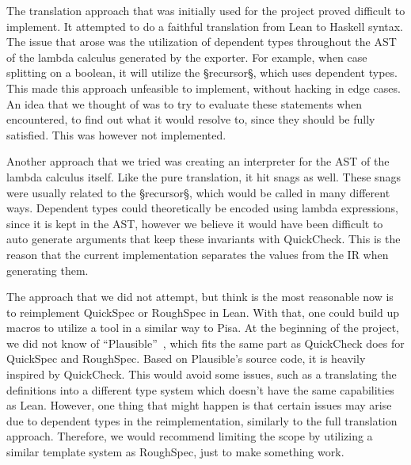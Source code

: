 The translation approach that was initially used for the project proved difficult to implement.
It attempted to do a faithful translation from Lean to Haskell syntax.
The issue that arose was the utilization of dependent types throughout the AST of the lambda calculus generated by the exporter.
For example, when case splitting on a boolean, it will utilize the §recursor§, which uses dependent types.
This made this approach unfeasible to implement, without hacking in edge cases.
An idea that we thought of was to try to evaluate these statements when encountered, to find out what it would resolve to, since they should be fully satisfied.
This was however not implemented.

Another approach that we tried was creating an interpreter for the AST of the lambda calculus itself.
Like the pure translation, it hit snags as well.
These snags were usually related to the §recursor§, which would be called in many different ways.
Dependent types could theoretically be encoded using lambda expressions, since it is kept in the AST, however we believe it would have been difficult to auto generate arguments that keep these invariants with QuickCheck.
This is the reason that the current implementation separates the values from the IR when generating them.

The approach that we did not attempt, but think is the most reasonable now is to reimplement QuickSpec or RoughSpec in Lean.
With that, one could build up macros to utilize a tool in a similar way to Pisa.
At the beginning of the project, we did not know of ``Plausible''~\autocite{Plausible}, which fits the same part as QuickCheck does for QuickSpec and RoughSpec.
Based on Plausible's source code, it is heavily inspired by QuickCheck.
This would avoid some issues, such as a translating the definitions into a different type system which doesn't have the same capabilities as Lean.
However, one thing that might happen is that certain issues may arise due to dependent types in the reimplementation, similarly to the full translation approach.
Therefore, we would recommend limiting the scope by utilizing a similar template system as RoughSpec, just to make something work.
